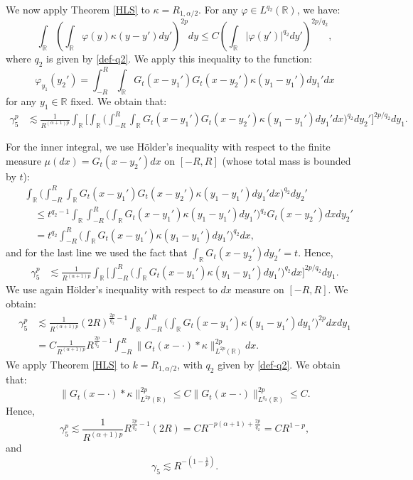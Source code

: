 \documentclass[12pt]{article}
\def\bR{\mathbb{R}}
\newcommand{\les}{\lesssim}
\def\k{\kappa}
\begin{document}
\begin{itemize}
We now apply Theorem \ref{HLS} to $\k=R_{1,\alpha/2}$. For any $\varphi \in L^{q_2}(\bR)$, we have:
\[
\int_{\bR}\left( \int_{\bR}\varphi(y)\k(y-y') dy'\right)^{2p} dy \leq C \left(\int_{\bR}|\varphi(y')|^{q_2}dy' \right)^{2p/q_2},
\]
where $q_2$ is given by \eqref{def-q2}. We apply this inequality to the function:
\[
\varphi_{y_1}(y_2')=\int_{-R}^R \int_{\bR} G_t(x-y_1') G_t(x-y_2')\k(y_1-y_1') dy_1' dx 
\]
for any $y_1\in \bR$ fixed. We obtain that:
\begin{align*}
\gamma_5^p & \les \frac{1}{R^{(\alpha+1)p}} \int_{\bR} \Bigg[ \int_{\bR} \Big( \int_{-R}^R \int_{\bR} G_t(x-y_1') G_t(x-y_2')\k(y_1-y_1') dy_1' dx \Big)^{q_2} dy_2' \Bigg]^{2p/q_2} dy_1.
\end{align*}

For the inner integral, we use H\"older's inequality with respect to the finite measure $\mu(dx)=G_t(x-y_2')dx$ on $[-R,R]$ (whose total mass is bounded by $t$):
\begin{align}
\nonumber
& \int_{\bR} \Big( \int_{-R}^R \int_{\bR} G_t(x-y_1') G_t(x-y_2')\k(y_1-y_1') dy_1' dx \Big)^{q_2} dy_2' \\
\nonumber
& \quad \leq  t^{q_2-1} \int_{\bR}  \int_{-R}^R \Big(\int_{\bR} G_t(x-y_1') \k (y_1-y_1') dy_1' \Big)^{q_2} G_t(x-y_2')dx dy_2'\\
\label{gam5-1}
&\quad = t^{q_2} \int_{-R}^R \Big(\int_{\bR} G_t(x-y_1') \k (y_1-y_1') dy_1' \Big)^{q_2} dx,
\end{align}
and for the last line we used the fact that $\int_{\bR}G_t(x-y_2')dy_2'=t$. Hence,
\begin{align*}
\gamma_5^p & \les \frac{1}{R^{(\alpha+1)p}} \int_{\bR} \Bigg[\int_{-R}^R \Big(\int_{\bR} G_t(x-y_1') \k (y_1-y_1') dy_1' \Big)^{q_2} dx \Bigg]^{2p/q_2} dy_1.
\end{align*}
We use again H\"{o}lder's inequality with respect to $dx$ measure on $[-R,R]$. We obtain:
\begin{align*}
\gamma_5^p & \les \frac{1}{R^{(\alpha+1)p}} (2R)^{\frac{2p}{q_2}-1} \int_{\bR} \int_{-R}^R \Big(\int_{\bR} G_t(x-y_1') \k (y_1-y_1') dy_1' \Big)^{2p} dx dy_1 \\
& =C \frac{1}{R^{(\alpha+1)p}} R^{\frac{2p}{q_2}-1} \int_{-R}^R \|G_t(x-\cdot)*\k\|_{L^{2p}(\bR)}^{2p} dx.
\end{align*}
We apply Theorem \ref{HLS} to $k=R_{1,\alpha/2}$, with $q_2$ given by \eqref{def-q2}. We obtain that:
\[
\|G_t(x-\cdot)*\k\|_{L^{2p}(\bR)}^{2p}\leq C\|G_{t}(x-\cdot)\|_{L^{q_2}(\bR)}^{2p}\leq C.
\]
Hence,
\[
\gamma_5^p \les \frac{1}{R^{(\alpha+1)p}} R^{\frac{2p}{q_2}-1} (2R)=C R^{-p(\alpha+1)+\frac{2p}{q_2}}=CR^{1-p},
\]
and 
\[
\gamma_5 \les R^{-(1-\frac{1}{p})}.
\]


\end{itemize}
\end{document}
